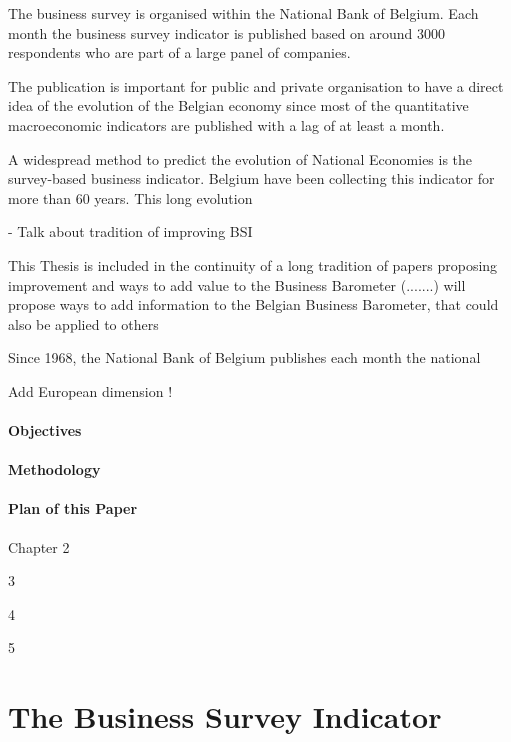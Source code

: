 \documentclass[12pt,a4paper,oneside]{book}
\begin{document}
The business survey is organised within the National Bank of Belgium.
Each month the business survey indicator is published based on around 3000 respondents who are part of a large panel of companies.

The publication is important for public and private organisation to have a direct idea of the evolution of the Belgian economy since most of the quantitative macroeconomic indicators are published with a lag of at least a month.

A widespread method to predict the evolution of National Economies is the survey-based business indicator. Belgium have been collecting this indicator for more than 60 years. This long evolution 


- Talk about tradition of improving BSI

This Thesis is included in the continuity of a long tradition of papers proposing improvement and ways to add value to the Business Barometer (.......) will propose ways to add information to the Belgian Business Barometer, that could also be applied to others

Since 1968, the National Bank of Belgium publishes each month the national 

Add European dimension !


\subsubsection{Objectives}

\subsubsection{Methodology}

\subsubsection{Plan of this Paper}

Chapter 2

3

4

5


\chapter{The Business Survey Indicator}
\end{document}
